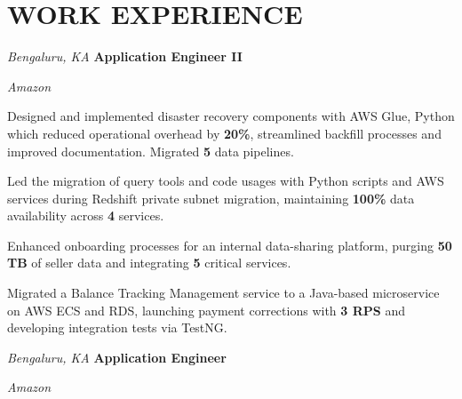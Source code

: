 \section{WORK EXPERIENCE}

\begin{twocolentry}{
    \textit{Bengaluru, KA}}
    \textbf{Application Engineer II}
    
    \textit{Amazon}
\end{twocolentry}

\vspace{0.15 cm}
\begin{onecolentry}
    \begin{highlights}
        \item Designed and implemented disaster recovery components with AWS Glue, Python which reduced operational overhead by \textbf{20\%}, streamlined backfill processes and improved documentation. Migrated \textbf{5} data pipelines.
        \item Led the migration of query tools and code usages with Python scripts and AWS services during Redshift private subnet migration, maintaining \textbf{100\%} data availability across \textbf{4} services.
        \item Enhanced onboarding processes for an internal data-sharing platform, purging \textbf{50 TB} of seller data and integrating \textbf{5} critical services.
        \item Migrated a Balance Tracking Management service to a Java-based microservice on AWS ECS and RDS, launching payment corrections with \textbf{3 RPS} and developing integration tests via TestNG.
    \end{highlights}
\end{onecolentry}

\vspace{0.15 cm}

\begin{twocolentry}{
    \textit{Bengaluru, KA}}
    \textbf{Application Engineer}
    
    \textit{Amazon}
\end{twocolentry}

\vspace{0.15 cm}

